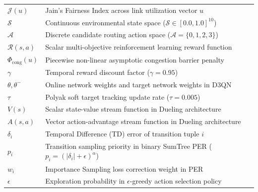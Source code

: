 \documentclass[12pt,a4paper,oneside]{report}
\begin{document}
\begin{tabular}{ll}
$\mathcal{J}(u)$ & Jain's Fairness Index across link utilization vector $u$ \\
$\mathcal{S}$ & Continuous environmental state space ($\mathcal{S} \in [0.0, 1.0]^{10}$) \\
$\mathcal{A}$ & Discrete candidate routing action space ($\mathcal{A} = \{0, 1, 2, 3\}$) \\
$\mathcal{R}(s, a)$ & Scalar multi-objective reinforcement learning reward function \\
$\Phi_{\text{cong}}(u)$ & Piecewise non-linear asymptotic congestion barrier penalty \\
$\gamma$ & Temporal reward discount factor ($\gamma = 0.95$) \\
$\theta, \theta^-$ & Online network weights and target network weights in D3QN \\
$\tau$ & Polyak soft target tracking update rate ($\tau = 0.005$) \\
$V(s)$ & Scalar state-value stream function in Dueling architecture \\
$A(s, a)$ & Vector action-advantage stream function in Dueling architecture \\
$\delta_i$ & Temporal Difference (TD) error of transition tuple $i$ \\
$p_i$ & Transition sampling priority in binary SumTree PER ($p_i = (|\delta_i| + \epsilon)^\alpha$) \\
$w_i$ & Importance Sampling loss correction weight in PER \\
$\epsilon$ & Exploration probability in $\epsilon$-greedy action selection policy \\
\end{tabular}

\newpage
{}
\setcounter{page}{1}












\end{document}
